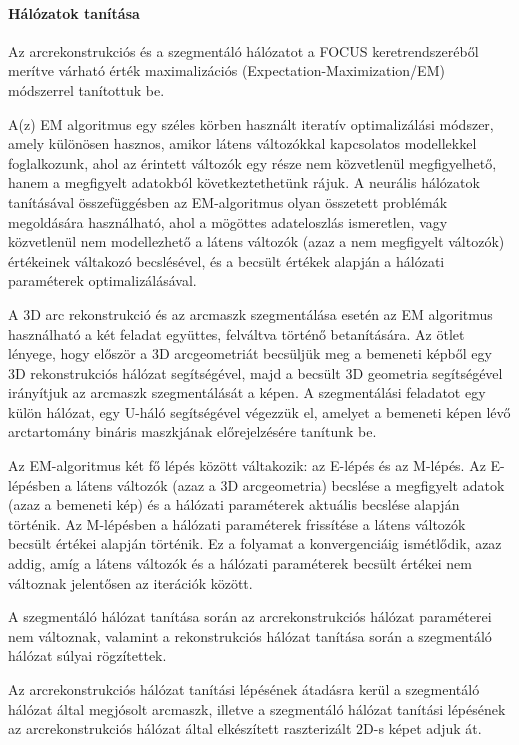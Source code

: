 \documentclass[12pt,a4]{article}
\begin{document}
        \clearpage

        \paragraph{Hálózatok tanítása}

        Az arcrekonstrukciós és a szegmentáló hálózatot a FOCUS keretrendszeréből merítve várható érték maximalizációs (Expectation-Maximization/EM) módszerrel tanítottuk be.

        A(z) EM algoritmus egy széles körben használt iteratív optimalizálási módszer, amely különösen hasznos, amikor látens változókkal kapcsolatos modellekkel foglalkozunk, ahol az érintett változók egy része nem közvetlenül megfigyelhető, hanem a megfigyelt adatokból következtethetünk rájuk. A neurális hálózatok tanításával összefüggésben az EM-algoritmus olyan összetett problémák megoldására használható, ahol a mögöttes adateloszlás ismeretlen, vagy közvetlenül nem modellezhető a látens változók (azaz a nem megfigyelt változók) értékeinek váltakozó becslésével, és a becsült értékek alapján a hálózati paraméterek optimalizálásával.

        A 3D arc rekonstrukció és az arcmaszk szegmentálása esetén az EM algoritmus használható a két feladat együttes, felváltva történő betanítására. Az ötlet lényege, hogy először a 3D arcgeometriát becsüljük meg a bemeneti képből egy 3D rekonstrukciós hálózat segítségével, majd a becsült 3D geometria segítségével irányítjuk az arcmaszk szegmentálását a képen. A szegmentálási feladatot egy külön hálózat, egy U-háló segítségével végezzük el, amelyet a bemeneti képen lévő arctartomány bináris maszkjának előrejelzésére tanítunk be.

        Az EM-algoritmus két fő lépés között váltakozik: az E-lépés és az M-lépés. Az E-lépésben a látens változók (azaz a 3D arcgeometria) becslése a megfigyelt adatok (azaz a bemeneti kép) és a hálózati paraméterek aktuális becslése alapján történik. Az M-lépésben a hálózati paraméterek frissítése a látens változók becsült értékei alapján történik. Ez a folyamat a konvergenciáig ismétlődik, azaz addig, amíg a látens változók és a hálózati paraméterek becsült értékei nem változnak jelentősen az iterációk között.

        A szegmentáló hálózat tanítása során az arcrekonstrukciós hálózat paraméterei nem változnak, valamint a rekonstrukciós hálózat tanítása során a szegmentáló hálózat súlyai rögzítettek.

        Az arcrekonstrukciós hálózat tanítási lépésének átadásra kerül a szegmentáló hálózat által megjósolt arcmaszk, illetve a szegmentáló hálózat tanítási lépésének az arcrekonstrukciós hálózat által elkészített raszterizált 2D-s képet adjuk át.
\end{document}
